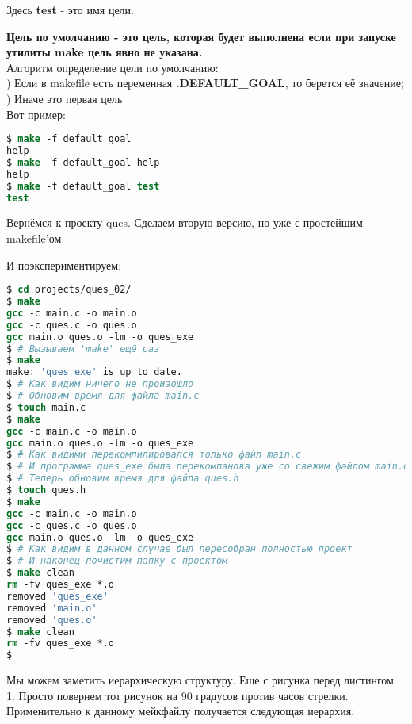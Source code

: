 Здесь \textbf{test} - это имя цели.

\textbf{Цель по умолчанию - это цель, которая будет выполнена если при запуске утилиты make цель явно не указана.} \\

Алгоритм определение цели по умолчанию: \\

) Если в makefile есть переменная \textbf{.DEFAULT\_GOAL}, то берется её значение; \\
) Иначе это первая цель \\

Вот пример:



\begin{lstlisting}[language=csh]
$ make -f default_goal
help
$ make -f default_goal help
help
$ make -f default_goal test
test
\end{lstlisting}

Вернёмся к проекту ques. Сделаем вторую версию, но уже с простейшим makefile'ом



И поэкспериментируем:

\begin{lstlisting}[language=csh]
$ cd projects/ques_02/
$ make
gcc -c main.c -o main.o
gcc -c ques.c -o ques.o
gcc main.o ques.o -lm -o ques_exe
$ # Вызываем 'make' ещё раз
$ make
make: 'ques_exe' is up to date.
$ # Как видим ничего не произошло
$ # Обновим время для файла main.c
$ touch main.c
$ make
gcc -c main.c -o main.o
gcc main.o ques.o -lm -o ques_exe
$ # Как видими перекомпилировался только файл main.c
$ # И программа ques_exe была перекомпанова уже со свежим файлом main.o
$ # Теперь обновим время для файла ques.h
$ touch ques.h
$ make
gcc -c main.c -o main.o
gcc -c ques.c -o ques.o
gcc main.o ques.o -lm -o ques_exe
$ # Как видим в данном случае был пересобран полностью проект
$ # И наконец почистим папку с проектом
$ make clean
rm -fv ques_exe *.o
removed 'ques_exe'
removed 'main.o'
removed 'ques.o'
$ make clean
rm -fv ques_exe *.o
$
\end{lstlisting}

Мы можем заметить иерархическую структуру. Еще с рисунка перед листингом 1. Просто повернем тот рисунок на 90 градусов против часов стрелки. Применительно к данному мейкфайлу получается следующая иерархия:

